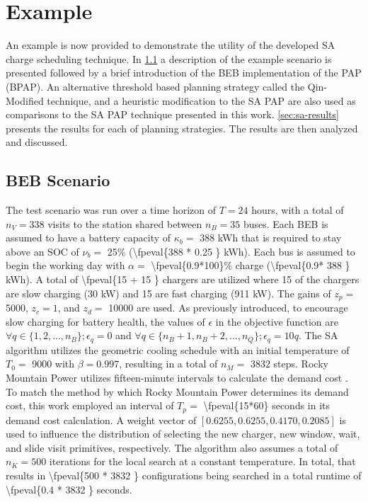 \documentclass[energies,article,submit,moreauthors]{Definitions/mdpi}
\newcommand{\A}{35 }                                                            %
\newcommand{\N}{338 }                                                           %
\newcommand{\Cgain}{5000}                                                       %
\newcommand{\acharge}{0.9}                                                      %
\newcommand{\mincharge}{25\% }                                                  %
\newcommand{\minchargeD}{0.25 }                                                 %
\newcommand{\batsize}{388 }                                                     %
\newcommand{\fast}{15 }                                                         %
\newcommand{\slow}{15 }                                                         %
\newcommand{\fasts}{911 }                                                       %
\newcommand{\slows}{30 }                                                        %
\newcommand{\localcnt}{500 }                                                    %
\newcommand{\tempinit}{9000 }                                                   %
\newcommand{\tempcnt}{3832 }                                                    %
\newcommand{\quicklocal}{0.4 }                                                  %
\begin{document}
\section{Example}
\label{sec:sa-example}
An example is now provided to demonstrate the utility of the developed SA charge scheduling technique. In
\ref{sec:sa-beb-scenario} a description of the example scenario is presented followed by a brief introduction of the BEB
implementation of the PAP (BPAP). An alternative threshold based planning strategy called the Qin-Modified technique,
and a heuristic modification to the SA PAP are also used as comparisons to the SA PAP technique presented in this work.
\ref{sec:sa-results} presents the results for each of planning strategies. The results are then analyzed and discussed.

\subsection{BEB Scenario}
\label{sec:sa-beb-scenario}
The test scenario was run over a time horizon of \(T=24\) hours, with a total of \(n_V = \N\) visits to the station shared
between \(n_B = \A\) buses. Each BEB is assumed to have a battery capacity of \(\kappa_b =\) \batsize kWh that is required to
stay above an SOC of \(\nu_b =\) \mincharge (\num{\fpeval{\batsize * \minchargeD}} kWh). Each bus is assumed to
begin the working day with \(\alpha =\) \num{\fpeval{\acharge*100}}\% charge (\num{\fpeval{\acharge * \batsize}} kWh). A total of \num{\fpeval{\fast + \slow}} chargers are utilized where \slow of the chargers
are slow charging (\slows kW) and \fast are fast charging (\fasts kW). The gains of \(z_p =\) \num{\Cgain},
\(z_c = 1\), and \(z_d =\) \num{10000} are used. As previously introduced, to encourage slow charging for battery
health, the values of \(\epsilon\) in the objective function are \(\forall q \in \{1,2,..., n_B \}; \epsilon_q = 0\) and \(\forall q \in \{n_B + 1, n_B +
2, ..., n_Q\}; \epsilon_q = 10q\). The SA algorithm utilizes the geometric cooling schedule with an initial temperature of \(T_0
=\) \num{\tempinit} with \(\beta = 0.997\), resulting in a total of \(n_M =\) \num{\tempcnt} steps. Rocky
Mountain Power utilizes fifteen-minute intervals to calculate the demand cost \cite{rocky-mountain-power}. To match the
method by which Rocky Mountain Power determines its demand cost, this work employed an interval of \(T_p =\)
\num{\fpeval{15*60}} seconds in its demand cost calculation. A weight vector of \([0.6255, 0.6255, 0.4170,
0.2085]\) is used to influence the distribution of selecting the new charger, new window, wait, and slide visit
primitives, respectively. The algorithm also assumes a total of \(n_K = \localcnt\) iterations for the local search at a
constant temperature. In total, that results in \num{\fpeval{\localcnt * \tempcnt}} configurations being
searched in a total runtime of \num{\fpeval{\quicklocal * \tempcnt}} seconds.
\end{document}
